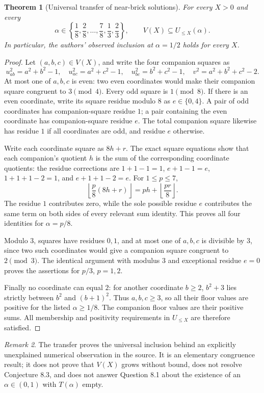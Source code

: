 \documentclass[11pt,a4paper]{article}
\newtheorem{theorem}{Theorem}[section]
\theoremstyle{definition}
\theoremstyle{remark}
\newtheorem{remark}[theorem]{Remark}
\numberwithin{equation}{section}
\begin{document}
\begin{theorem}[Universal transfer of near-brick solutions]
\label{f13:thm:nearbrick-transfer}
For every $X>0$ and every
\[
 \alpha\in\left\{\frac18,\frac28,\ldots,\frac78,
                         \frac13,\frac23\right\},
 \qquad V(X)\subseteq U_{\leq X}(\alpha).
\]
In particular, the authors' observed inclusion at $\alpha=1/2$ holds
for every $X$.
\end{theorem}

\begin{proof}
Let $(a,b,c)\in V(X)$, and write the four companion squares as
\[
 u_{ab}^2=a^2+b^2-1,\quad u_{ac}^2=a^2+c^2-1,\quad
 u_{bc}^2=b^2+c^2-1,\quad v^2=a^2+b^2+c^2-2.
\]
At most one of $a,b,c$ is even: two even coordinates would make
their companion square congruent to $3\pmod4$.
Every odd square is $1\pmod8$. If there is an even coordinate,
write its square residue modulo $8$ as $e\in\{0,4\}$.
A pair of odd coordinates has companion-square residue $1$;
a pair containing the even coordinate has companion-square residue $e$.
The total companion square likewise has residue $1$ if all coordinates
are odd, and residue $e$ otherwise.

Write each coordinate square as $8h+r$. The exact square equations
show that each companion's quotient $h$ is the sum of the corresponding
coordinate quotients: the residue corrections are
$1+1-1=1$, $e+1-1=e$, $1+1+1-2=1$, and $e+1+1-2=e$.
For $1\leq p\leq7$,
\[
 \left\lfloor\frac p8(8h+r)\right\rfloor
 =ph+\left\lfloor\frac{pr}{8}\right\rfloor.
\]
The residue $1$ contributes zero, while the sole possible residue $e$
contributes the same term on both sides of every relevant sum identity.
This proves all four identities for $\alpha=p/8$.

Modulo $3$, squares have residues $0,1$, and at most one of $a,b,c$
is divisible by $3$, since two such coordinates would give a companion
square congruent to $2\pmod3$. The identical argument with modulus $3$
and exceptional residue $e=0$ proves the assertions for $p/3$, $p=1,2$.

Finally no coordinate can equal $2$: for another coordinate $b\geq2$,
$b^2+3$ lies strictly between $b^2$ and $(b+1)^2$.
Thus $a,b,c\geq3$, so all their floor values are positive for the
listed $\alpha\geq1/8$. The companion floor values are their positive
sums. All membership and positivity requirements in $U_{\leq X}$
are therefore satisfied.
\end{proof}

\begin{remark}
The transfer proves the universal inclusion behind an explicitly
unexplained numerical observation in the source. It is an elementary
congruence result; it does not prove that $V(X)$ grows without bound,
does not resolve Conjecture 8.3, and does not answer Question 8.1 about
the existence of an $\alpha\in(0,1)$ with $T(\alpha)$ empty.
\end{remark}
\end{document}
